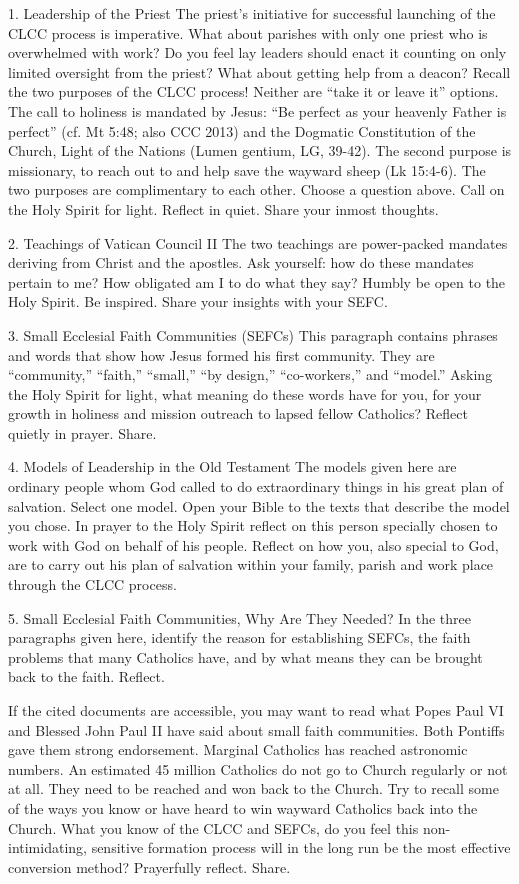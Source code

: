 \documentclass[oneside]{book}
\begin{document}
1. Leadership of the Priest
The priest's initiative for successful launching of the CLCC process is
imperative. What about parishes with only one priest who is overwhelmed with
work? Do you feel lay leaders should enact it counting on only limited oversight
from the priest? What about getting help from a deacon? Recall the two purposes
of the CLCC process! Neither are ``take it or leave it'' options.  The call to
holiness is mandated by Jesus: ``Be perfect as your heavenly Father is perfect''
(cf. Mt 5:48; also CCC 2013) and the Dogmatic Constitution of the Church, Light
of the Nations (Lumen gentium, LG, 39-42). The second purpose is missionary, to
reach out to and help save the wayward sheep (Lk 15:4-6). The two purposes are
complimentary to each other. Choose a question above. Call on the Holy Spirit
for light. Reflect in quiet. Share your inmost thoughts.

2. Teachings of Vatican Council II
The two teachings are power-packed mandates deriving from Christ and the
apostles. Ask yourself: how do these mandates pertain to me? How obligated am I
to do what they say?  Humbly be open to the Holy Spirit. Be inspired. Share your
insights with your SEFC.

3. Small Ecclesial Faith Communities (SEFCs)
This paragraph contains phrases and words that show how Jesus formed his first
community. They are ``community,'' ``faith,'' ``small,'' ``by design,''
``co-workers,'' and ``model.'' Asking the Holy Spirit for light, what meaning do
these words have for you, for your growth in holiness and mission outreach to
lapsed fellow Catholics? Reflect quietly in prayer. Share.

4. Models of Leadership in the Old Testament
The models given here are ordinary people whom God called to do extraordinary
things in his great plan of salvation. Select one model. Open your Bible to the
texts that describe the model you chose. In prayer to the Holy Spirit reflect on
this person specially chosen to work with God on behalf of his people. Reflect
on how you, also special to God, are to carry out his plan of salvation within
your family, parish and work place through the CLCC process.

5. Small Ecclesial Faith Communities, Why Are They Needed?
In the three paragraphs given here, identify the reason for establishing SEFCs,
the faith problems that many Catholics have, and by what means they can be
brought back to the faith. Reflect.

If the cited documents are accessible, you may want to read what Popes Paul VI
and Blessed John Paul II have said about small faith communities. Both Pontiffs
gave them strong endorsement. Marginal Catholics has reached astronomic
numbers. An estimated 45 million Catholics do not go to Church regularly or not
at all. They need to be reached and won back to the Church. Try to recall some
of the ways you know or have heard to win wayward Catholics back into the
Church. What you know of the CLCC and SEFCs, do you feel this non-intimidating,
sensitive formation process will in the long run be the most effective
conversion method? Prayerfully reflect. Share.
\end{document}
